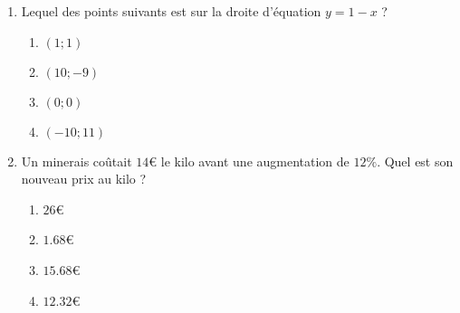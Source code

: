 
\begin{exercice}\label{exosmath-0438}

    \begin{multicols}{2}
        \begin{enumerate}
            \item
                Lequel des points suivants est sur la droite d'équation \( y=1-x\) ?
                \begin{enumerate}
                    \item
                        \( (1;1)\)
                    \item
                        \( (10;-9)\)
                    \item
                        \( (0;0)\)
                    \item
                        \( (-10;11)\)
                \end{enumerate}
                \columnbreak
            \item
                Un minerais coûtait \( 14\)€ le kilo avant une augmentation de \( 12\%\). Quel est son nouveau prix au kilo ?
                \begin{enumerate}
                    \item
                        \( 26\)€
                    \item
                        \( 1.68\)€
                    \item
                        \( 15.68\)€
                    \item
                        \( 12.32\)€
                \end{enumerate}
        \end{enumerate}
    \end{multicols}

\end{exercice}
